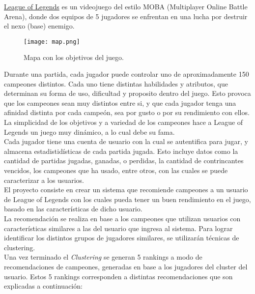 \documentclass[letterpaper,11pt, spanish]{article}
\begin{document}
\href{las.leagueoflegends.com}{League of Legends} es un videojuego del estilo MOBA (Multiplayer Online Battle Arena),
donde dos equipos de 5 jugadores se enfrentan en una lucha por destruir el nexo
(base) enemigo. \\

\begin{figure}[h]
	\begin{center}
		\texttt{[image: map.png]}
	\end{center}
	\caption{Mapa con los objetivos del juego.}
\end{figure}

Durante una partida, cada jugador puede controlar uno de aproximadamente 150 campeones
distintos. Cada uno tiene distintas habilidades y atributos, que determinan
su forma de uso, dificultad y proposito dentro del juego. Esto provoca que
los campeones sean muy distintos entre si, y que cada jugador tenga una afinidad
distinta por cada campeón, sea por gusto o por su rendimiento con ellos. La simplicidad
de los objetivos y a variedad de los campeones hace a League of Legends un juego
muy dinámico, a lo cual debe su fama. \\

Cada jugador tiene una cuenta de usuario con la cual se autentifica para jugar, y
almacena estadistidísticas de cada partida jugada. Esto incluye datos como
la cantidad de partidas jugadas, ganadas, o perdidas, la cantidad de contrincantes vencidos,
los campeones que ha usado, entre otros, con las cuales se puede caracterizar a
los usuarios. \\

El proyecto consiste en crear un sistema que recomiende campeones a un usuario de
League of Legends con los cuales pueda tener un buen rendimiento en el juego,
basado en las características de dicho usuario. \\

La recomendación se realiza en base a los campeones que utilizan usuarios con
características similares a las del usuario que ingresa al sistema. Para lograr
identificar los distintos grupos de jugadores similares, se utilizarán técnicas
de clustering. \\

Una vez terminado el \textit{Clustering} se generan 5 rankings a modo de recomendaciones de campeones, generadas en base a los jugadores del cluster del usuario. Estos 5 rankings corresponden a distintas recomendaciones que son explicadas a continuación:
\end{document}

